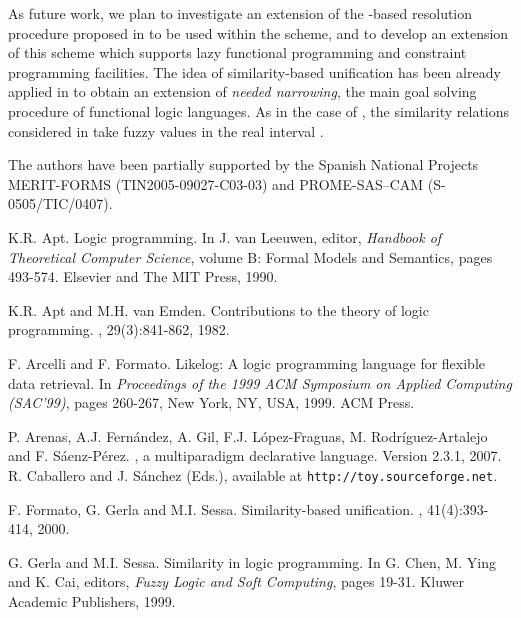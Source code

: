 \documentclass{sigplanconf}
\theoremstyle{definition}
\theoremstyle{plain}
\begin{document}
As future work, we plan to investigate an extension of the -based  resolution procedure proposed in \cite{Ses02} to be used within the  scheme, and to develop an extension of this scheme which supports lazy functional programming and constraint programming facilities. The idea of  similarity-based unification has been already applied in \cite{MP06a} to obtain an extension of {\em needed narrowing}, the main goal solving procedure of functional logic languages. As in the case of \cite{Ses02}, the similarity relations considered in \cite{MP06a} take fuzzy values in the real interval .

\acks
The authors have been partially supported by the Spanish National Projects MERIT-FORMS (TIN2005-09027-C03-03) and PROME-SAS--CAM (S-0505/TIC/0407).



\begin{thebibliography}{22}

K.R. Apt.
\newblock Logic programming.
\newblock In J. van Leeuwen, editor, {\em Handbook of Theoretical Computer Science}, volume B: Formal Models and Semantics, pages 493-574. Elsevier and The MIT Press, 1990.

K.R. Apt and M.H. van Emden.
\newblock Contributions to the theory of logic programming.
, 29(3):841-862, 1982.

F. Arcelli and F. Formato.
\newblock Likelog: A logic programming language for flexible data retrieval.
\newblock In {\em Proceedings of the 1999 ACM Symposium on Applied Computing (SAC'99)}, pages 260-267, New York, NY, USA, 1999. ACM Press.

P. Arenas, A.J. Fern\'andez, A. Gil, F.J. L\'opez-Fraguas, M. Rodr\'iguez-Artalejo and F. S\'aenz-P\'erez.
\newblock , a multiparadigm declarative language. Version 2.3.1, 2007.
\newblock R. Caballero and J. S\'anchez (Eds.), available at \texttt{http://toy.sourceforge.net}.

F. Formato, G. Gerla and M.I. Sessa.
\newblock Similarity-based unification.
, 41(4):393-414, 2000.

\vfill\eject

G. Gerla and M.I. Sessa.
\newblock Similarity in logic programming.
\newblock In G. Chen, M. Ying and K. Cai, editors, {\em Fuzzy Logic and Soft Computing}, pages 19-31. Kluwer Academic Publishers, 1999.


\end{thebibliography}
\end{document}
